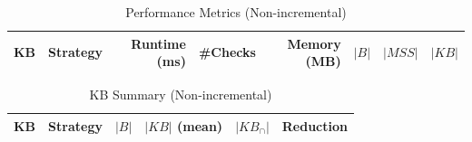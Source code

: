 \begin{table}[htbp]
\centering
\caption{Performance Metrics (Non-incremental)}
\label{tab:performance_non-incremental}
\begin{tabular}{llrrrrrr}
\toprule
KB & Strategy & Runtime (ms) & \#Checks & Memory (MB) & $|B|$ & $|MSS|$ & $|KB|$ \\
\midrule
\bottomrule
\end{tabular}
\end{table}

\begin{table}[htbp]
\centering
\caption{KB Summary (Non-incremental)}
\label{tab:kb_summary_non-incremental}
\begin{tabular}{llrrrr}
\toprule
KB & Strategy & $|B|$ & $|KB|$ (mean) & $|KB_{\cap}|$ & Reduction \\
\midrule
\bottomrule
\end{tabular}
\end{table}